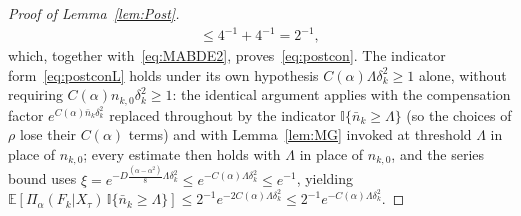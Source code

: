 \documentclass[10pt,a4paper]{amsart}
\def\bbE{\mathbb E}
\def\ind{\mathbb{I}}
\begin{document}
\begin{proof}[Proof of Lemma~\ref{lem:Post}]
\begin{align}
    \leq 4^{-1} + 4^{-1} = 2^{-1},
    \label{eq:MABDE9}
\end{align}
which, together with~\eqref{eq:MABDE2}, proves~\eqref{eq:postcon}. The indicator form~\eqref{eq:postconL} holds under its own hypothesis $C(\alpha) \Lambda \delta_k^2 \geq 1$ alone, without requiring $C(\alpha) n_{k,0} \delta_k^2 \geq 1$: the identical argument applies with the compensation factor $e^{C(\alpha)\bar n_k \delta_k^2}$ replaced throughout by the indicator $\ind\{\bar n_k \geq \Lambda\}$ (so the choices of $\rho$ lose their $C(\alpha)$ terms) and with Lemma~\ref{lem:MG} invoked at threshold $\Lambda$ in place of $n_{k,0}$; every estimate then holds with $\Lambda$ in place of $n_{k,0}$, and the series bound uses $\xi = e^{-D\frac{(\alpha-\alpha^2)}{8} \Lambda \delta_k^2} \leq e^{-C(\alpha) \Lambda \delta_k^2} \leq e^{-1}$, yielding $\bbE[\Pi_{\alpha}(F_k|X_{\tau})\, \ind\{\bar n_k \geq \Lambda\}] \leq 2^{-1} e^{-2C(\alpha) \Lambda \delta_k^2} \leq 2^{-1} e^{-C(\alpha) \Lambda \delta_k^2}$.
\end{proof}
\end{document}
